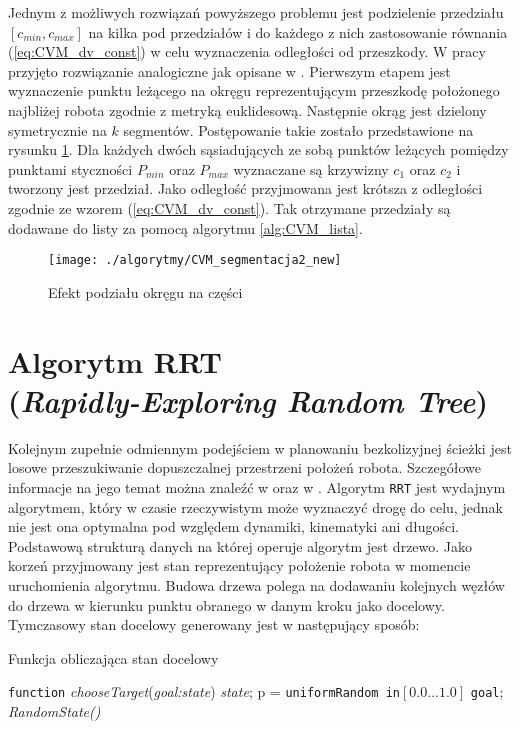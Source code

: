	Jednym z możliwych rozwiązań powyższego problemu jest podzielenie przedziału $[c_{min},c_{max}]$ na kilka
	pod przedziałów i do każdego z nich zastosowanie równania (\ref{eq:CVM_dv_const}) w celu wyznaczenia odległości od przeszkody. W pracy przyjęto rozwiązanie analogiczne jak opisane w \cite{majchrowski}.
	Pierwszym etapem jest wyznaczenie punktu leżącego na okręgu reprezentującym przeszkodę położonego najbliżej robota zgodnie z  metryką euklidesową. Następnie okrąg jest dzielony symetrycznie na $k$  segmentów. Postępowanie takie zostało przedstawione na rysunku \ref{fig:CVM_segmentacja2}. 
	Dla każdych dwóch sąsiadujących ze sobą punktów leżących pomiędzy punktami styczności $P_{min}$ oraz $P_{max}$
 	wyznaczane są krzywizny $c_1$ oraz $c_2$ i tworzony jest przedział. Jako odległość przyjmowana jest krótsza 
	z odległości zgodnie ze wzorem (\ref{eq:CVM_dv_const}). Tak otrzymane przedziały są dodawane do listy za pomocą algorytmu \ref{alg:CVM_lista}.
	
	\begin{figure}[H]
	\centering
	\texttt{[image: ./algorytmy/CVM\_segmentacja2\_new]}
	\caption{ Efekt podziału okręgu na części} \label{fig:CVM_segmentacja2}
	\end{figure} 
\section{Algorytm RRT\\(\textit{Rapidly-Exploring Random Tree}) \label{sec:RRT:basic}}
Kolejnym zupełnie odmiennym podejściem w planowaniu bezkolizyjnej ścieżki jest losowe przeszukiwanie dopuszczalnej przestrzeni położeń robota. Szczegółowe informacje na
jego temat można znaleźć w \cite{RRT} oraz w \cite{RRT2}.
Algorytm \texttt{RRT} jest wydajnym algorytmem, który w czasie rzeczywistym może wyznaczyć drogę do celu, jednak nie jest ona optymalna pod względem dynamiki, kinematyki ani długości.
Podstawową strukturą danych na której operuje algorytm jest drzewo. Jako korzeń przyjmowany jest stan reprezentujący położenie robota w momencie uruchomienia algorytmu.
Budowa drzewa polega na dodawaniu kolejnych węzłów do drzewa w kierunku punktu obranego w danym kroku jako docelowy. Tymczasowy stan docelowy generowany jest w następujący sposób:
 \begin{algorithm}[H]
	
	\caption{ Funkcja obliczająca stan docelowy }
	\label{alg:chooseTarget}
	\begin{algorithmic}
	\STATE \texttt{function} \textit{chooseTarget}(\textit{goal:state}) \textit{state};
	\STATE p = \texttt{uniformRandom in}$[0.0 ...1.0]$
	  \RETURN  \texttt{goal};
	  \RETURN \textit{RandomState()}
	\ENDIF
	\end{algorithmic}
  \end{algorithm}

